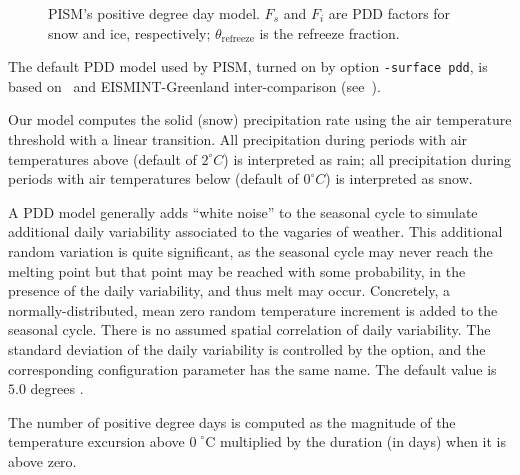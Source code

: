 \documentclass[titlepage,letterpaper,final]{scrartcl}
\begin{document}
\begin{figure}
  \caption{PISM's positive degree day model. $F_s$ and $F_i$ are PDD
    factors for snow and ice, respectively; $\theta_{\text{refreeze}}$
    is the refreeze fraction.}
  \label{fig:pdd-model}
\end{figure}

The default PDD model used by PISM, turned on by option
\texttt{-surface pdd}, is based on~\cite{CalovGreve05} and
EISMINT-Greenland inter-comparison (see~\cite{RitzEISMINT}).

Our model computes the solid (snow) precipitation rate using the air
temperature threshold with a linear transition. All precipitation
during periods with air temperatures above
 (default of $2^\circ C$) is
interpreted as rain; all precipitation during periods with air
temperatures below  (default of
$0^\circ C$) is interpreted as snow.

A PDD model generally adds ``white noise'' to the seasonal cycle to simulate
additional daily variability associated to the vagaries of weather. This
additional random variation is quite significant, as the seasonal cycle may
never reach the melting point but that point may be reached with some
probability, in the presence of the daily variability, and thus melt may occur.
Concretely, a normally-distributed, mean zero random temperature increment is
added to the seasonal cycle. There is no assumed spatial correlation of daily
variability. The standard deviation of the daily variability is controlled by
the  option, and the corresponding configuration
parameter has the same name. The default value is $5.0$ degrees
\cite{RitzEISMINT}.

The number of positive degree days is computed as the magnitude of the
temperature excursion above $0\!\phantom{|}^\circ \text{C}$ multiplied by the
duration (in days) when it is above zero.
\end{document}
